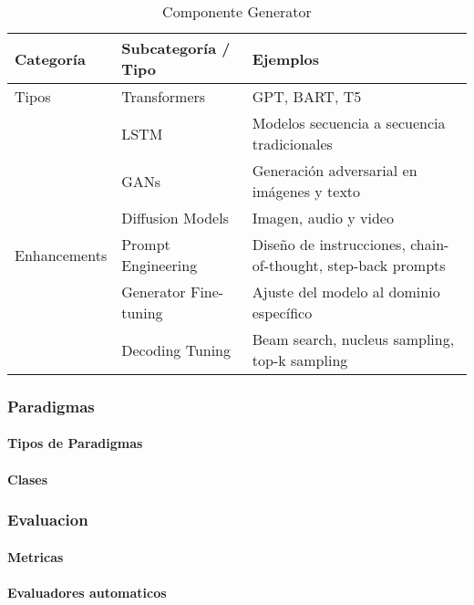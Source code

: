 \begin{table}[H]
\centering


\begin{tabularx}{\textwidth}{|l|l|>{\raggedright\arraybackslash}X|}
\hline
\textbf{Categoría} & \textbf{Subcategoría / Tipo} & \textbf{Ejemplos} \\ \hline
Tipos & Transformers & GPT, BART, T5 \\ \hline
      & LSTM         & Modelos secuencia a secuencia tradicionales \\ \hline
      & GANs         & Generación adversarial en imágenes y texto \\ \hline
      & Diffusion Models & Imagen, audio y video \\ \hline
Enhancements & Prompt Engineering & Diseño de instrucciones, chain-of-thought, step-back prompts \\ \hline
             & Generator Fine-tuning & Ajuste del modelo al dominio específico \\ \hline
             & Decoding Tuning & Beam search, nucleus sampling, top-k sampling \\ \hline
\end{tabularx}
\caption{Componente Generator}
\end{table}

\subsubsection{Paradigmas}

\paragraph{Tipos de Paradigmas}

\paragraph{Clases}

\subsubsection{Evaluacion}

\paragraph{Metricas}


\paragraph{Evaluadores automaticos}






